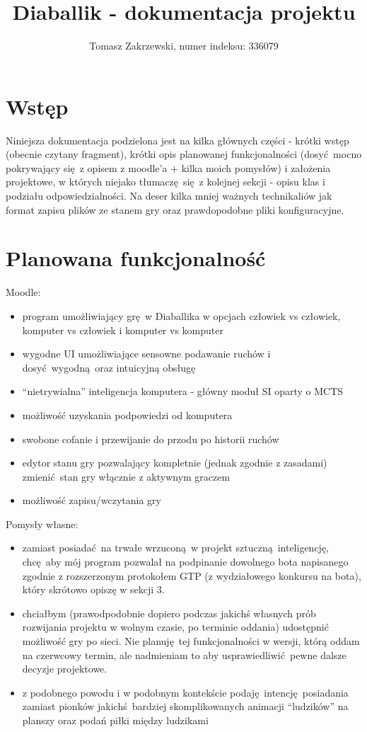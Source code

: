 \documentclass[a4paper,12pt]{article}
\title{Diaballik - dokumentacja projektu}
\author{Tomasz Zakrzewski, numer indeksu: 336079}
\begin{document}
\maketitle

\setcounter{tocdepth}{2}

\tableofcontents

\setcounter{section}{0}
\pagebreak

\section{Wstęp}
Niniejsza dokumentacja podzielona jest na kilka głównych części - krótki wstęp (obecnie czytany fragment), krótki opis planowanej funkcjonalności 
(dosyć mocno pokrywający się z opisem z moodle'a + kilka moich pomysłów) i założenia projektowe, w których niejako tłumaczę się z kolejnej sekcji -
opisu klas i podziału odpowiedzialności. Na deser kilka mniej ważnych technikaliów jak format zapisu plików ze stanem gry oraz prawdopodobne pliki
konfiguracyjne.

\section{Planowana funkcjonalność}
Moodle:
\begin{itemize}
\item program umożliwiający grę w Diaballika w opcjach człowiek vs człowiek, komputer vs człowiek i komputer vs komputer
\item wygodne UI umożliwiające sensowne podawanie ruchów i dosyć wygodną oraz intuicyjną obsługę
\item ``nietrywialna'' inteligencja komputera - główny moduł SI oparty o MCTS
\item możliwość uzyskania podpowiedzi od komputera
\item swobone cofanie i przewijanie do przodu po historii ruchów
\item edytor stanu gry pozwalający kompletnie (jednak zgodnie z zasadami) zmienić stan gry włącznie z aktywnym graczem
\item możliwość zapisu/wczytania gry
\end{itemize}
Pomysły własne:
\begin{itemize}
\item zamiast posiadać na trwałe wrzuconą w projekt sztuczną inteligencję, chcę aby mój program pozwalał na podpinanie dowolnego bota napisanego
zgodnie z rozszerzonym protokołem GTP (z wydziałowego konkursu na bota), który skrótowo opiszę w sekcji 3.
\item chciałbym (prawodpodobnie dopiero podczas jakichś własnych prób rozwijania projektu  w wolnym czasie, po terminie oddania) udostępnić możliwość
gry po sieci. Nie planuję tej funkcjonalności w wersji, którą oddam na czerwcowy termin, ale nadmieniam to aby usprawiedliwić pewne dalsze decyzje 
projektowe.
\item z podobnego powodu i w podobnym kontekście podaję intencję posiadania zamiast pionków jakichś bardziej skomplikowanych animacji ``ludzików'' na
planszy oraz podań piłki między ludzikami
\end{itemize}
\end{document}
